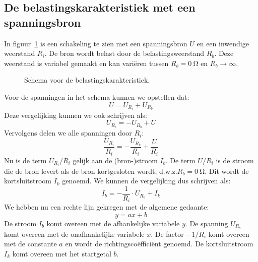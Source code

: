 \subsection{De belastingskarakteristiek met een spanningsbron}
In figuur~\ref{fig:gelschemavoorbelastingskarakteristiek} is een schakeling te zien met een spanningsbron
$U$ en een inwendige weerstand $R_i$. De bron wordt belast door de belastingsweerstand $R_b$. Deze weerstand
is variabel gemaakt en kan vari\"eren tussen $R_b = \SI{0}{\ohm}$ en $R_b \rightarrow \infty$.

\begin{figure}[!ht]
\centering
{}
\captionsetup{width=.9\linewidth}
\caption{Schema voor de belastingskarakteristiek.}
\label{fig:gelschemavoorbelastingskarakteristiek}
\end{figure}

Voor de spanningen in het schema kunnen we opstellen dat:
%
\begin{equation}
U = U_{R_i} + U_{R_b}
\end{equation}
%
Deze vergelijking kunnen we ook schrijven als:
\begin{equation}
U_{R_i} = - U_{R_b} + U
\end{equation}
%
Vervolgens delen we alle spanningen door $R_i$:
%
\begin{equation}
\dfrac{U_{R_i}}{R_i} = - \dfrac{U_{R_b}}{R_i} + \dfrac{U}{R_i}
\end{equation}
%
Nu is de term $U_{R_i}/R_i$ gelijk aan de (bron-)stroom $I_b$. De term $U/R_i$ is de stroom die de bron levert
als de bron kortgesloten wordt, d.w.z.\@ $R_b=\SI{0}{\ohm}$. Dit wordt de kortsluitstroom $I_k$ genoemd. We kunnen de
vergelijking dus schrijven als:
%
\begin{equation}
\label{equ:gelbelastingsfunctie}
I_b = -\dfrac{1}{R_i}\cdot U_{R_b} + I_k
\end{equation}
%
We hebben nu een rechte lijn gekregen met de algemene gedaante:
%
\begin{equation}
y=ax+b
\end{equation}
%
De stroom $I_b$ komt overeen met de afhankelijke variabele $y$. De spanning $U_{R_b}$ komt overeen met de
onafhankelijke variabele $x$. De factor $-1/R_i$ komt overeen met de constante $a$ en wordt de
richtingsco\"effici\"ent genoemd. De kortsluitstroom $I_k$ komt overeen met het startgetal $b$.

